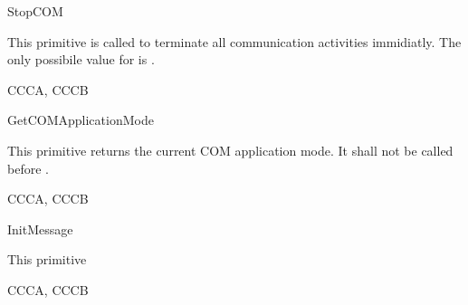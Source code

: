 \begin{function}{StopCOM}
  \begin{fundescription}
    This primitive is called to terminate all communication activities
    immidiatly. The only possibile value for  is
    .
  \end{fundescription}
  \begin{funparameters}
  \end{funparameters}
  \begin{funreturn}
  \end{funreturn}
  \begin{funconformance}
    CCCA, CCCB
  \end{funconformance}
\end{function}


\begin{function}{GetCOMApplicationMode}
  \begin{fundescription}
    This primitive returns the current COM application mode. It shall
    not be called before .
  \end{fundescription}
  \begin{funparameters}
  \end{funparameters}
  \begin{funreturn}
  \end{funreturn}
  \begin{funconformance}
    CCCA, CCCB
  \end{funconformance}
\end{function}

\begin{function}{InitMessage}
  \begin{fundescription}
    This primitive 
  \end{fundescription}
  \begin{funparameters}
  \end{funparameters}
  \begin{funreturn}
  \end{funreturn}
  \begin{funconformance}
    CCCA, CCCB
  \end{funconformance}
\end{function}

